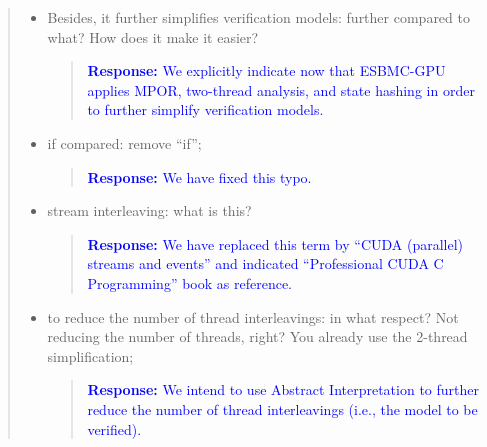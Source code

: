 \documentclass[11pt]{article}
\begin{document}
\begin{quote}
\begin{itemize}
\begin{itemize}
  \item Besides, it further simplifies verification models: further compared to what? How does it make it easier?
  
    \begin{quote}
    \textcolor{blue}{\textbf{Response:} We explicitly indicate now that ESBMC-GPU applies MPOR, two-thread analysis, and state hashing in order to further simplify verification models.}
    \end{quote}

  \item if compared: remove ``if'';
  
    \begin{quote}
    \textcolor{blue}{\textbf{Response:} We have fixed this typo.}
    \end{quote}

  \item stream interleaving: what is this?
  
    \begin{quote}
    \textcolor{blue}{\textbf{Response:} We have replaced this term by ``CUDA (parallel) streams and events'' and indicated ``Professional CUDA C Programming'' book as reference.}
    \end{quote}

  \item  to reduce the number of thread interleavings: in what respect? Not reducing the number of threads, right? You already use the 2-thread simplification;
  
    \begin{quote}
    \textcolor{blue}{\textbf{Response:} We intend to use Abstract Interpretation to further reduce the number of thread interleavings (i.e., the model to be verified).}
    \end{quote}

  \end{itemize}
\end{itemize}

\end{quote}

\label{LastPage}

\end{document}
